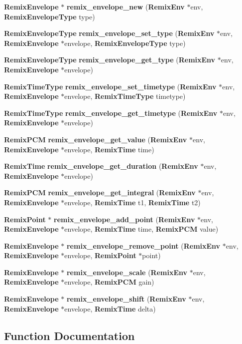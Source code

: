 \begin{CompactItemize}
\item 
{\bf Remix\-Envelope} $\ast$ {\bf remix\_\-envelope\_\-new} ({\bf Remix\-Env} $\ast$env, {\bf Remix\-Envelope\-Type} type)
\item 
{\bf Remix\-Envelope\-Type} {\bf remix\_\-envelope\_\-set\_\-type} ({\bf Remix\-Env} $\ast$env, {\bf Remix\-Envelope} $\ast$envelope, {\bf Remix\-Envelope\-Type} type)
\item 
{\bf Remix\-Envelope\-Type} {\bf remix\_\-envelope\_\-get\_\-type} ({\bf Remix\-Env} $\ast$env, {\bf Remix\-Envelope} $\ast$envelope)
\item 
{\bf Remix\-Time\-Type} {\bf remix\_\-envelope\_\-set\_\-timetype} ({\bf Remix\-Env} $\ast$env, {\bf Remix\-Envelope} $\ast$envelope, {\bf Remix\-Time\-Type} timetype)
\item 
{\bf Remix\-Time\-Type} {\bf remix\_\-envelope\_\-get\_\-timetype} ({\bf Remix\-Env} $\ast$env, {\bf Remix\-Envelope} $\ast$envelope)
\item 
{\bf Remix\-PCM} {\bf remix\_\-envelope\_\-get\_\-value} ({\bf Remix\-Env} $\ast$env, {\bf Remix\-Envelope} $\ast$envelope, {\bf Remix\-Time} time)
\item 
{\bf Remix\-Time} {\bf remix\_\-envelope\_\-get\_\-duration} ({\bf Remix\-Env} $\ast$env, {\bf Remix\-Envelope} $\ast$envelope)
\item 
{\bf Remix\-PCM} {\bf remix\_\-envelope\_\-get\_\-integral} ({\bf Remix\-Env} $\ast$env, {\bf Remix\-Envelope} $\ast$envelope, {\bf Remix\-Time} t1, {\bf Remix\-Time} t2)
\item 
{\bf Remix\-Point} $\ast$ {\bf remix\_\-envelope\_\-add\_\-point} ({\bf Remix\-Env} $\ast$env, {\bf Remix\-Envelope} $\ast$envelope, {\bf Remix\-Time} time, {\bf Remix\-PCM} value)
\item 
{\bf Remix\-Envelope} $\ast$ {\bf remix\_\-envelope\_\-remove\_\-point} ({\bf Remix\-Env} $\ast$env, {\bf Remix\-Envelope} $\ast$envelope, {\bf Remix\-Point} $\ast$point)
\item 
{\bf Remix\-Envelope} $\ast$ {\bf remix\_\-envelope\_\-scale} ({\bf Remix\-Env} $\ast$env, {\bf Remix\-Envelope} $\ast$envelope, {\bf Remix\-PCM} gain)
\item 
{\bf Remix\-Envelope} $\ast$ {\bf remix\_\-envelope\_\-shift} ({\bf Remix\-Env} $\ast$env, {\bf Remix\-Envelope} $\ast$envelope, {\bf Remix\-Time} delta)
\end{CompactItemize}


\subsection{Function Documentation}
